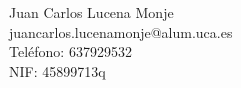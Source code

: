 Juan Carlos Lucena Monje \\ %
juancarlos.lucenamonje@alum.uca.es \\ %
Teléfono: 637929532 \\ %
NIF: 45899713q \\ %

